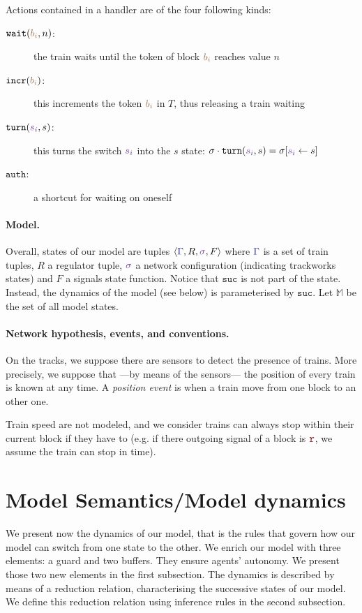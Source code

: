\documentclass[runningheads]{llncs}
\newcommand{\tuple}[1]{\ensuremath{\langle #1\rangle}}
\newcommand{\sucblock}{{\mathtt{suc}}}
\newcommand{\modelSet}{\ensuremath{\mathbb{M}}}
\newcommand{\posFmt}[1]{{\color{poscolor}{#1}}}
\newcommand{\bid}[1]{\ensuremath{\posFmt{b_{#1}}}}
\newcommand{\swFmt}[1]{{\color{swcolor}{#1}}}
\newcommand{\sid}[1]{\ensuremath{\swFmt{s_{#1}}}}
\newcommand{\switches}{\ensuremath{\swFmt{\sigma}}}
\newcommand{\trainFmt}[1]{{\color{traincolor} #1}}
\newcommand{\trainSeq}{\ensuremath{\trainFmt{\Gamma}}\xspace}
\newcommand{\incr}[1]{{\mbox{\ensuremath{\mathtt{incr}(\posFmt{#1})}}}\xspace}
\newcommand{\turn}[2]{{\mbox{\ensuremath{\mathtt{turn}(#1, #2)}}}\xspace}
\newcommand{\auth}{{\mbox{\ensuremath{\mathtt{auth}}}}\xspace}
\newcommand{\regulator}{\ensuremath{R}}
\newcommand{\wait}[2]{{\mbox{\ensuremath{\mathtt{wait}(\posFmt{#1}, #2)}}}\xspace}
\newcommand{\sigred}{{\mbox{${\color{red!50!black}\mathtt{r}}$}}\xspace}
\newcommand{\signals}{\ensuremath{F}}
\begin{document}
Actions contained in a handler are of the four following kinds:
\begin{description}
	\item [\wait{\bid{i}}{n}:] the train waits until the token of block \bid{i} reaches value $n$
	\item [\incr{\bid{i}}:] this increments the token $\bid{i}$ in $T$, thus releasing a train waiting
	\item [\turn{\sid{i}}{s}:] this turns the switch $\sid{i}$ into the $s$ state: $\sigma\cdot\turn{\sid{i}}{s} = \sigma[\sid{i} \leftarrow s]$
	\item [\auth:] a shortcut for waiting on oneself
\end{description}

\paragraph{Model.}
Overall, states of our model are tuples $\tuple{\trainSeq, \regulator, \switches, \signals}$ where $\trainSeq$ is a set of train tuples, $\regulator$ a regulator tuple, $\switches$ a network configuration (indicating trackworks states) and $\signals$ a signals state function.
 Notice that $\sucblock$ is not part of the state. Instead, the dynamics of the model (see below) is parameterised by $\sucblock$. Let $\modelSet$ be the set of all model states.

\paragraph{Network hypothesis, events, and conventions.}
On the tracks, we suppose there are sensors to detect the presence of trains. More precisely, we suppose that ---by means of the sensors--- the position of every train is known at any time. A \emph{position event} is when a train move from one block to an other one. 

Train speed are not modeled, and we consider trains can always stop within their current block if they have to (e.g. if there outgoing signal of a block is \sigred, we assume the train can stop in time).


\section{Model Semantics/Model dynamics}
\label{sec:model_semantics}

We present now the dynamics of our model, that is the rules that govern how our model can switch from one state to the other.
We enrich our model with three elements: a guard and two buffers. They ensure agents' autonomy. %
We present those two new elements in the first subsection.
The dynamics is described by means of a reduction relation, characterising the successive states of our model. We define this reduction relation using inference rules in the second subsection.
\end{document}
